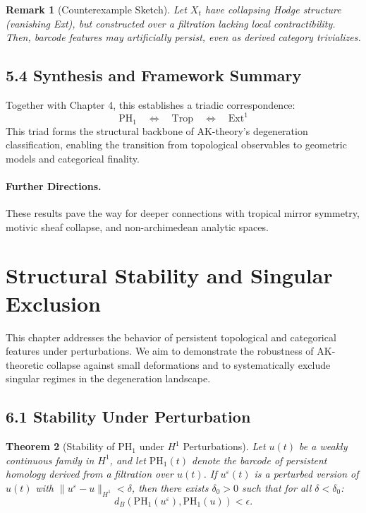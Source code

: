\documentclass[11pt]{article}
\newtheorem{theorem}{Theorem}[section]
\newtheorem{remark}[theorem]{Remark}
\begin{document}
\begin{remark}[Counterexample Sketch]
Let $X_t$ have collapsing Hodge structure (vanishing Ext), but constructed over a filtration lacking local contractibility. Then, barcode features may artificially persist, even as derived category trivializes.
\end{remark}

\subsection{5.4 Synthesis and Framework Summary}

Together with Chapter 4, this establishes a triadic correspondence:
\[
\mathrm{PH}_1 \quad \Longleftrightarrow \quad \mathrm{Trop} \quad \Longleftrightarrow \quad \mathrm{Ext}^1
\]
This triad forms the structural backbone of AK-theory’s degeneration classification, enabling the transition from topological observables to geometric models and categorical finality.

\paragraph{Further Directions.}
These results pave the way for deeper connections with tropical mirror symmetry, motivic sheaf collapse, and non-archimedean analytic spaces.



\section{Structural Stability and Singular Exclusion}

This chapter addresses the behavior of persistent topological and categorical features under perturbations. We aim to demonstrate the robustness of AK-theoretic collapse against small deformations and to systematically exclude singular regimes in the degeneration landscape.

\subsection{6.1 Stability Under Perturbation}

\begin{theorem}[Stability of PH$_1$ under $H^1$ Perturbations]
Let $u(t)$ be a weakly continuous family in $H^1$, and let $\mathrm{PH}_1(t)$ denote the barcode of persistent homology derived from a filtration over $u(t)$. If $u^\varepsilon(t)$ is a perturbed version of $u(t)$ with $\|u^\varepsilon - u\|_{H^1} < \delta$, then there exists $\delta_0 > 0$ such that for all $\delta < \delta_0$:
\[
d_B(\mathrm{PH}_1(u^\varepsilon), \mathrm{PH}_1(u)) < \epsilon.
\]
\end{theorem}
\end{document}
